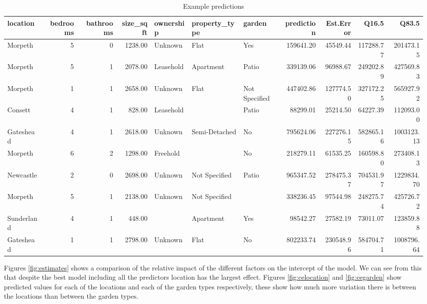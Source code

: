 \documentclass{scrartcl}
\begin{document}
\begin{landscape}
	\begin{table}[htbp]
		\centering
		\caption{Example predictions} 
		\label{tab:pred}
		\begin{adjustbox}{max width=\linewidth}
		\begin{tabular}{lrrrlllrrrr}
			\hline
			location & bedrooms & bathrooms & size\_sqft & ownership & property\_type & garden & prediction & Est.Error & Q16.5 & Q83.5 \\ 
			\hline
			Morpeth &   5 &   0 & 1238.00 & Unknown & Flat & Yes & 159641.20 & 45549.44 & 117288.77 & 201473.15 \\ 
			Morpeth &   5 &   1 & 2078.00 & Leasehold & Apartment & Patio & 339139.06 & 96988.67 & 249202.89 & 427569.83 \\ 
			Morpeth &   1 &   1 & 2658.00 & Unknown & Flat & Not Specified & 447402.86 & 127774.50 & 327172.25 & 565927.92 \\ 
			Consett &   4 &   1 & 828.00 & Leasehold &  & Patio & 88299.01 & 25214.50 & 64227.39 & 112093.00 \\ 
			Gateshead &   4 &   1 & 2618.00 & Unknown & Semi-Detached & No & 795624.06 & 227276.15 & 582865.16 & 1003123.13 \\ 
			Morpeth &   6 &   2 & 1298.00 & Freehold &  & No & 218279.11 & 61535.25 & 160598.80 & 273408.13 \\ 
			Newcastle &   2 &   0 & 2698.00 & Unknown & Not Specified & Patio & 965347.52 & 278475.37 & 704531.97 & 1229834.70 \\ 
			Morpeth &   5 &   1 & 2138.00 & Unknown & Not Specified &  & 338236.45 & 97544.98 & 248275.74 & 425726.72 \\ 
			Sunderland &   4 &   1 & 448.00 &  & Apartment & Yes & 98542.27 & 27582.19 & 73011.07 & 123859.88 \\ 
			Gateshead &   1 &   1 & 2798.00 & Unknown & Flat & No & 802233.74 & 230548.96 & 584704.71 & 1008796.64 \\ 
			\hline
		\end{tabular}
	\end{adjustbox}
	\end{table}

\end{landscape}

Figures \ref{fig:estimates} shows a comparison of the relative impact of the different factors on the intercept of the model. We can see from this that despite the best model including all the predictors location has the largest effect. Figures \ref{fig:celocation} and \ref{fig:cegarden} show predicted values for each of the locations and each of the garden types respectively, these show how much more variation there is between the locations than between the garden types.
\end{document}
